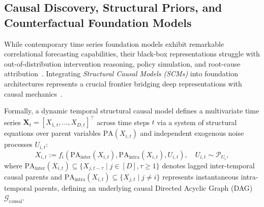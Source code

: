 \subsection{Causal Discovery, Structural Priors, and Counterfactual Foundation Models}
\label{sec:causal_foundation}

While contemporary time series foundation models exhibit remarkable correlational forecasting capabilities, their black-box representations struggle with out-of-distribution intervention reasoning, policy simulation, and root-cause attribution~\cite{jander2026causal}. Integrating \emph{Structural Causal Models (SCMs)} into foundation architectures represents a crucial frontier bridging deep representations with causal mechanics~\cite{stein2024embracing,thumm2026interventional}.

Formally, a dynamic temporal structural causal model defines a multivariate time series $\mathbf{X}_t = [X_{1,t}, \dots, X_{D,t}]^\top$ across time steps $t$ via a system of structural equations over parent variables $\text{PA}(X_{i,t})$ and independent exogenous noise processes $U_{i,t}$:
\begin{equation}
    X_{i,t} := f_i\left(\text{PA}_{\text{inter}}(X_{i,t}), \text{PA}_{\text{intra}}(X_{i,t}), U_{i,t}\right), \quad U_{i,t} \sim \mathcal{P}_{U_i},
\end{equation}
where $\text{PA}_{\text{inter}}(X_{i,t}) \subseteq \{X_{j,t-\tau} \mid j \in [D], \tau \ge 1\}$ denotes lagged inter-temporal causal parents and $\text{PA}_{\text{intra}}(X_{i,t}) \subseteq \{X_{j,t} \mid j \neq i\}$ represents instantaneous intra-temporal parents, defining an underlying causal Directed Acyclic Graph (DAG) $\mathcal{G}_{\text{causal}}$.

